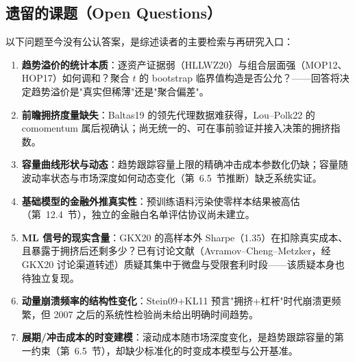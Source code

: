 \documentclass[11pt,a4paper]{article}
\begin{document}
\subsection{遗留的课题（Open Questions）}
以下问题至今没有公认答案，是综述读者的主要检索与再研究入口：
\begin{enumerate}
\item \textbf{趋势溢价的统计本质}：逐资产证据弱（HLLWZ20）与组合层面强（MOP12、HOP17）如何调和？聚合 $t$ 的 bootstrap 临界值构造是否公允？——回答将决定趋势溢价是"真实但稀薄"还是"聚合偏差"。
\item \textbf{前瞻拥挤度量缺失}：Baltas19 的领先代理数据难获得，Lou--Polk22 的 comomentum 属后视确认；尚无统一的、可在事前验证并接入决策的拥挤指数。
\item \textbf{容量曲线形状与动态}：趋势跟踪容量上限的精确冲击成本参数化仍缺；容量随波动率状态与市场深度如何动态变化（第~6.5~节推断）缺乏系统实证。
\item \textbf{基础模型的金融外推真实性}：预训练语料污染使零样本结果被高估（第~12.4~节），独立的金融白名单评估协议尚未建立。
\item \textbf{ML 信号的现实含量}：GKX20 的高样本外 Sharpe（1.35）在扣除真实成本、且暴露于拥挤后还剩多少？已有讨论文献（Avramov--Cheng--Metzker，经 GKX20 讨论渠道转述）质疑其集中于微盘与受限套利时段——该质疑本身也待独立复现。
\item \textbf{动量崩溃频率的结构性变化}：Stein09+KL11 预言"拥挤+杠杆"时代崩溃更频繁，但 2007 之后的系统性检验尚未给出明确时间趋势。
\item \textbf{展期/冲击成本的时变建模}：滚动成本随市场深度变化，是趋势跟踪容量的第一约束（第~6.5~节），却缺少标准化的时变成本模型与公开基准。
\end{enumerate}
\end{document}
